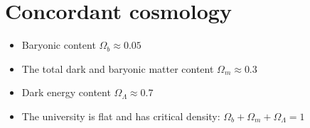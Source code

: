 \documentclass{article}
\begin{document}
\section{Concordant cosmology}
\begin{itemize}
\item Baryonic content  $\Omega_b \approx 0.05$
\item The total dark and baryonic matter content $\Omega_m \approx 0.3$
\item Dark energy content $\Omega_\Lambda \approx 0.7$
\item The university is flat and has critical density:  $\Omega_b+\Omega_m+\Omega_\Lambda=1$
\end{itemize}
\end{document}
